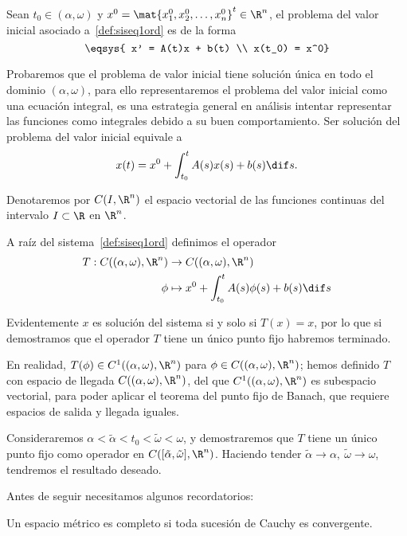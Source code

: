 \documentclass[../main.tex]{subfiles}
\begin{document}
\begin{definition}
	Sean \(t_0 \in (\alpha, \omega)\) y 
	\(x^0 = \mat{x^0_1, x^0_2, \dots, x^0_n}^t \in \R^n\), el problema del valor
	inicial asociado a~\ref{def:siseq1ord} es de la forma
	\[\eqsys{
		x' = A(t)x + b(t) \\
		x(t_0) = x^0}\]
\end{definition}

Probaremos que el problema de valor inicial tiene solución única en todo el
dominio \((\alpha, \omega)\), para ello representaremos el problema del valor 
inicial como una ecuación integral, es una estrategia general en análisis 
intentar representar las funciones como integrales debido a su buen
comportamiento. Ser solución del problema del valor inicial equivale a
\[x(t) = x^0 + \int_{t_0}^t A(s)x(s) + b(s) \dif s.\]

Denotaremos por \(C(I, \R^n)\) el espacio vectorial de las funciones continuas
del intervalo \(I \subset \R\) en \(\R^n\).

A raíz del sistema~\ref{def:siseq1ord} definimos el operador
\begin{align*}
  T : C((\alpha, \omega), \R^n) &\to C((\alpha, \omega), \R^n) \\
  \phi  &\mapsto x^0 + \int_{t_0}^t A(s) \phi(s) + b(s) \dif s
\end{align*}

Evidentemente \(x\) es solución del sistema si y solo si \(T(x) = x\), por lo
que si demostramos que el operador \(T\) tiene un único punto fijo habremos
terminado. 

\begin{remark}
  En realidad, \(T(\phi) \in C^1((\alpha, \omega), \R^n)\) para
  \(\phi \in C((\alpha, \omega), \R^n)\); hemos definido \(T\) con espacio de
  llegada \(C((\alpha, \omega), \R^n)\), del que \(C^1((\alpha, \omega), \R^n)\)
  es subespacio vectorial, para poder aplicar el teorema del punto fijo de
  Banach, que requiere espacios de salida y llegada iguales.
\end{remark}

Consideraremos \(\alpha < \tilde{\alpha} < t_0 < \tilde{\omega} < \omega\), y
demostraremos que \(T\) tiene un único punto fijo como operador en
\(C([\tilde{\alpha}, \tilde{\omega}], \R^n)\). Haciendo tender \(\tilde{\alpha}
\to \alpha,\ \tilde{\omega} \to \omega\), tendremos el resultado deseado.

Antes de seguir necesitamos algunos recordatorios:

\begin{definition}
	Un espacio métrico es completo si toda sucesión de Cauchy es convergente.
\end{definition}
\end{document}
